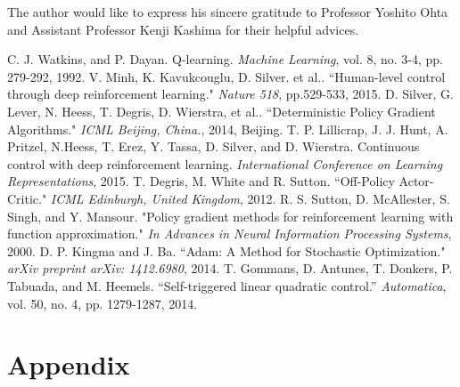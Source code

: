 \documentclass[english, dvipdfmx]{ampmt}             %
\begin{document}
\acknowledgment
The author would like to express his sincere gratitude to Professor
Yoshito Ohta and Assistant Professor Kenji Kashima for their helpful advices.

\begin{thebibliography}{10}
C. J. Watkins, and P. Dayan. Q-learning. \textit{Machine Learning}, vol. 8, no. 3-4, pp. 279-292, 1992.
V. Minh, K. Kavukcouglu, D. Silver. et al.. “Human-level control through deep reinforcement learning." \textit{Nature 518}, pp.529-533, 2015.
D. Silver, G. Lever, N. Heess, T. Degris, D. Wierstra, et al.. “Deterministic Policy Gradient Algorithms." \textit{ICML Beijing, China.}, 2014, Beijing.
T. P. Lillicrap, J. J. Hunt, A. Pritzel, N.Heess, T. Erez, Y. Tassa, D. Silver, and D. Wierstra. Continuous control with deep reinforcement learning. \textit{International Conference on Learning Representations}, 2015.
T. Degris, M. White and R. Sutton. “Off-Policy Actor-Critic." \textit{ICML Edinburgh, United Kingdom}, 2012.
R. S. Sutton, D. McAllester, S. Singh, and Y. Mansour. "Policy gradient methods for reinforcement learning with function approximation." \textit{In Advances in Neural Information Processing Systems}, 2000.
D. P. Kingma and J. Ba. “Adam: A Method for Stochastic Optimization." \textit{arXiv preprint arXiv: 1412.6980}, 2014.
T. Gommans, D. Antunes, T. Donkers, P. Tabuada, and M. Heemels. “Self-triggered linear quadratic control.” \textit{Automatica}, vol. 50, no. 4, pp. 1279-1287, 2014.

\end{thebibliography}

\appendix

\section{Appendix}
\end{document}
